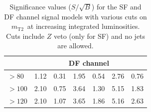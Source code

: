 \documentclass[runningheads,a4paper]{llncs}
\newcommand{\mttwo}{$m_{\text{T2}}$}
\begin{document}
\begin{table}[h]
\begin{tabular}{|l|llllll}
                  & \multicolumn{6}{c|}{\textbf{DF channel}}                                                                                                                                                                                                                  \\ \hline
$>80$   & \multicolumn{1}{l|}{1.12}               & \multicolumn{1}{l|}{0.31}               & \multicolumn{1}{l|}{1.95}               & \multicolumn{1}{l|}{0.54}               & \multicolumn{1}{l|}{2.76}               & \multicolumn{1}{l|}{0.76}               \\ \hline
$>100$   & \multicolumn{1}{l|}{2.10}               & \multicolumn{1}{l|}{0.75}               & \multicolumn{1}{l|}{3.64}               & \multicolumn{1}{l|}{1.30}               & \multicolumn{1}{l|}{5.15}               & \multicolumn{1}{l|}{1.83}               \\ \hline
$>120$    & \multicolumn{1}{l|}{2.10}               & \multicolumn{1}{l|}{1.07}               & \multicolumn{1}{l|}{3.65}               & \multicolumn{1}{l|}{1.86}               & \multicolumn{1}{l|}{5.16}               & \multicolumn{1}{l|}{2.63}               \\ \hline
\end{tabular}
\caption{Significance values ($S/\sqrt{B}$) for the SF and DF channel signal models with various cuts on \mttwo \, at increasing integrated luminosities. Cuts include $Z$ veto (only for SF) and no jets are allowed.}
\label{tab:SF_score}
\end{table}




\end{document}
